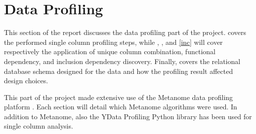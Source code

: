 
\section{Data Profiling} \label{profiling}

This section of the report discusses the data profiling part of the project.  covers the performed single column profiling steps, while , , and \cref{inc} will cover respectively the application of unique column combination, functional dependency, and inclusion dependency discovery. Finally,  covers the relational database schema designed for the data and how the profiling result affected design choices.

This part of the project made extensive use of the Metanome data profiling platform \cite{metanome}. Each section will detail which Metanome algorithms were used. In addition to Metanome, also the YData Profiling Python library \cite{ydataDocs} has been used for single column analysis.










